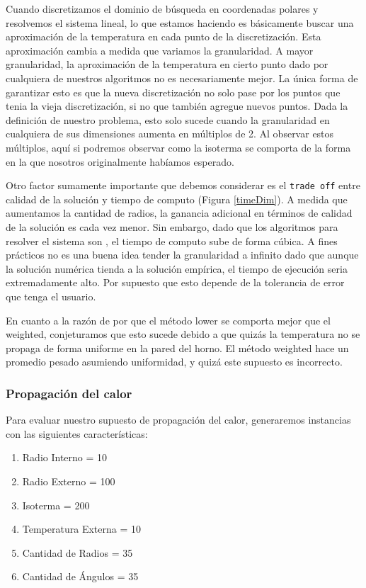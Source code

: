 Cuando discretizamos el dominio de búsqueda en coordenadas polares y resolvemos el sistema lineal, lo que estamos haciendo es básicamente buscar una aproximación de la temperatura en cada punto de la discretización. Esta aproximación cambia a medida que variamos la granularidad. A mayor granularidad, la aproximación de la temperatura en cierto punto dado por cualquiera de nuestros algoritmos no es necesariamente mejor. La única forma de garantizar esto es que la nueva discretización no solo pase por los puntos que tenia la vieja discretización, si no que también agregue nuevos puntos. Dada la definición de nuestro problema, esto solo sucede cuando la granularidad en cualquiera de sus dimensiones aumenta en múltiplos de 2. Al observar estos múltiplos, aquí si podremos observar como la isoterma se comporta de la forma en la que nosotros originalmente habíamos esperado.

Otro factor sumamente importante que debemos considerar es el \texttt{trade off} entre calidad de la solución y tiempo de computo (Figura \ref{timeDim}). A medida que aumentamos la cantidad de radios, la ganancia adicional en términos de calidad de la solución es cada vez menor. Sin embargo, dado que los algoritmos para resolver el sistema son , el tiempo de computo sube de forma cúbica. A fines prácticos no es una buena idea tender la granularidad a infinito dado que aunque la solución numérica tienda a la solución empírica, el tiempo de ejecución seria extremadamente alto. Por supuesto que esto depende de la tolerancia de error que tenga el usuario.

En cuanto a la razón de por que el método lower se comporta mejor que el weighted, conjeturamos que esto sucede debido a que quizás la temperatura no se propaga de forma uniforme en la pared del horno. El método weighted hace un promedio pesado asumiendo uniformidad, y quizá este supuesto es incorrecto.

\pagebreak

\subsubsection{Propagación del calor}

Para evaluar nuestro supuesto de propagación del calor, generaremos instancias con las siguientes características:

\begin{enumerate}
\item Radio Interno = 10
\item Radio Externo = 100
\item Isoterma = 200
\item Temperatura Externa = 10
\item Cantidad de Radios = 35
\item Cantidad de Ángulos = 35
\end{enumerate}

